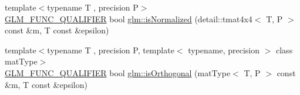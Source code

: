 \begin{DoxyCompactItemize}
\item 
{\footnotesize template$<$typename T , precision P$>$ }\\\hyperlink{setup_8hpp_a33fdea6f91c5f834105f7415e2a64407}{G\+L\+M\+\_\+\+F\+U\+N\+C\+\_\+\+Q\+U\+A\+L\+I\+F\+I\+ER} bool \hyperlink{group__gtx__matrix__query_gad0ff11cc2c26d3086d9f88316a321637}{glm\+::is\+Normalized} (detail\+::tmat4x4$<$ T, P $>$ const \&m, T const \&epsilon)
\item 
{\footnotesize template$<$typename T , precision P, template$<$ typename, precision $>$ class mat\+Type$>$ }\\\hyperlink{setup_8hpp_a33fdea6f91c5f834105f7415e2a64407}{G\+L\+M\+\_\+\+F\+U\+N\+C\+\_\+\+Q\+U\+A\+L\+I\+F\+I\+ER} bool \hyperlink{group__gtx__matrix__query_gab2cb5d23df77b4e4e63ad2965acd31b3}{glm\+::is\+Orthogonal} (mat\+Type$<$ T, P $>$ const \&m, T const \&epsilon)
\end{DoxyCompactItemize}
